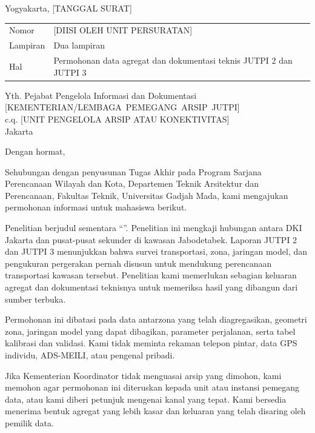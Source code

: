 \documentclass[12pt]{article}
\begin{document}
\KopSurat

\begin{flushright}
Yogyakarta, [TANGGAL SURAT]
\end{flushright}

\begin{tabularx}{\textwidth}{@{}P{0.20\textwidth}Y@{}}
  Nomor & [DIISI OLEH UNIT PERSURATAN] \\
  Lampiran & Dua lampiran \\
  Hal & Permohonan data agregat dan dokumentasi teknis JUTPI 2 dan JUTPI 3
\end{tabularx}

Yth. Pejabat Pengelola Informasi dan Dokumentasi\\
\mbox{[KEMENTERIAN/LEMBAGA PEMEGANG ARSIP JUTPI]}\\
c.q. [UNIT PENGELOLA ARSIP ATAU KONEKTIVITAS]\\
Jakarta

Dengan hormat,

Sehubungan dengan penyusunan Tugas Akhir pada Program Sarjana Perencanaan Wilayah dan Kota, Departemen Teknik Arsitektur dan Perencanaan, Fakultas Teknik, Universitas Gadjah Mada, kami mengajukan permohonan informasi untuk mahasiswa berikut.

\IdentitasMahasiswa

Penelitian berjudul sementara ``\JudulSementara''. Penelitian ini mengkaji hubungan antara DKI Jakarta dan pusat-pusat sekunder di kawasan Jabodetabek. Laporan JUTPI 2 dan JUTPI 3 menunjukkan bahwa survei transportasi, zona, jaringan model, dan pengukuran pergerakan pernah disusun untuk mendukung perencanaan transportasi kawasan tersebut. Penelitian kami memerlukan sebagian keluaran agregat dan dokumentasi teknisnya untuk memeriksa hasil yang dibangun dari sumber terbuka.

Permohonan ini dibatasi pada data antarzona yang telah diagregasikan, geometri zona, jaringan model yang dapat dibagikan, parameter perjalanan, serta tabel kalibrasi dan validasi. Kami tidak meminta rekaman telepon pintar, data GPS individu, ADS-MEILI, atau pengenal pribadi.

Jika Kementerian Koordinator tidak menguasai arsip yang dimohon, kami memohon agar permohonan ini diteruskan kepada unit atau instansi pemegang data, atau kami diberi petunjuk mengenai kanal yang tepat. Kami bersedia menerima bentuk agregat yang lebih kasar dan keluaran yang telah disaring oleh pemilik data.

\PernyataanPenggunaanData
\end{document}
